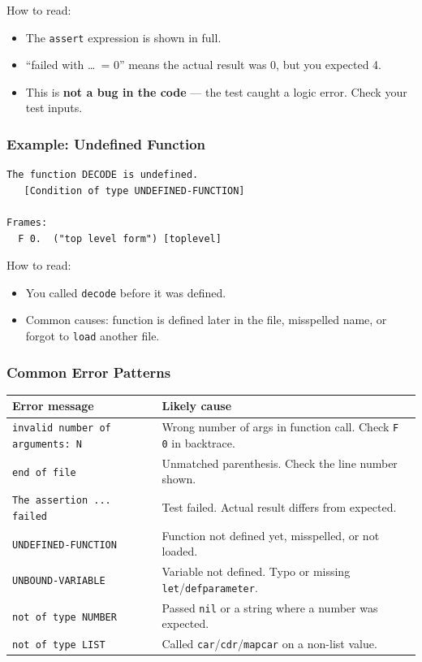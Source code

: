 How to read:
\begin{itemize}
  \item The \texttt{assert} expression is shown in full.
  \item ``failed with \ldots\ = 0'' means the actual result was 0,
        but you expected 4.
  \item This is \textbf{not a bug in the code} --- the test caught
        a logic error.  Check your test inputs.
\end{itemize}

\subsubsection{Example: Undefined Function}

\begin{lstlisting}
The function DECODE is undefined.
   [Condition of type UNDEFINED-FUNCTION]

Frames:
  F 0.  ("top level form") [toplevel]
\end{lstlisting}

How to read:
\begin{itemize}
  \item You called \texttt{decode} before it was defined.
  \item Common causes: function is defined later in the file,
        misspelled name, or forgot to \texttt{load} another file.
\end{itemize}

\subsubsection{Common Error Patterns}

\begin{center}
\begin{tabular}{lp{6cm}}
  \toprule
  \textbf{Error message} & \textbf{Likely cause} \\
  \midrule
  \texttt{invalid number of arguments: N}
    & Wrong number of args in function call.
      Check \texttt{F 0} in backtrace. \\
  \texttt{end of file}
    & Unmatched parenthesis.
      Check the line number shown. \\
  \texttt{The assertion ... failed}
    & Test failed. Actual result differs
      from expected. \\
  \texttt{UNDEFINED-FUNCTION}
    & Function not defined yet, misspelled,
      or not loaded. \\
  \texttt{UNBOUND-VARIABLE}
    & Variable not defined.
      Typo or missing \texttt{let}/\texttt{defparameter}. \\
  \texttt{not of type NUMBER}
    & Passed \texttt{nil} or a string where
      a number was expected. \\
  \texttt{not of type LIST}
    & Called \texttt{car}/\texttt{cdr}/\texttt{mapcar}
      on a non-list value. \\
  \bottomrule
\end{tabular}
\end{center}

